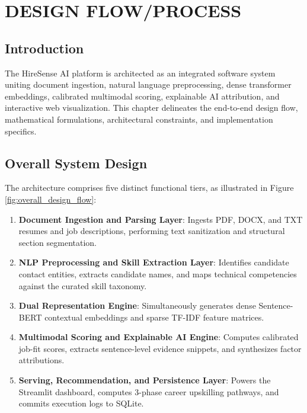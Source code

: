 \documentclass[12pt,a4paper]{report}
\begin{document}
\chapter{DESIGN FLOW/PROCESS}

\section{Introduction}
The HireSense AI platform is architected as an integrated software system uniting document ingestion, natural language preprocessing, dense transformer embeddings, calibrated multimodal scoring, explainable AI attribution, and interactive web visualization. This chapter delineates the end-to-end design flow, mathematical formulations, architectural constraints, and implementation specifics.

\section{Overall System Design}
The architecture comprises five distinct functional tiers, as illustrated in Figure \ref{fig:overall_design_flow}:
\begin{enumerate}
    \item \textbf{Document Ingestion and Parsing Layer}: Ingests PDF, DOCX, and TXT resumes and job descriptions, performing text sanitization and structural section segmentation.
    \item \textbf{NLP Preprocessing and Skill Extraction Layer}: Identifies candidate contact entities, extracts candidate names, and maps technical competencies against the curated skill taxonomy.
    \item \textbf{Dual Representation Engine}: Simultaneously generates dense Sentence-BERT contextual embeddings and sparse TF-IDF feature matrices.
    \item \textbf{Multimodal Scoring and Explainable AI Engine}: Computes calibrated job-fit scores, extracts sentence-level evidence snippets, and synthesizes factor attributions.
    \item \textbf{Serving, Recommendation, and Persistence Layer}: Powers the Streamlit dashboard, computes 3-phase career upskilling pathways, and commits execution logs to SQLite.
\end{enumerate}
\end{document}
